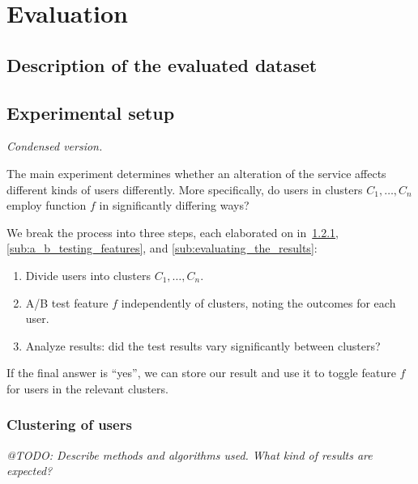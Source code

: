 \chapter{Evaluation}

\label{Chapter4}


\section{Description of the evaluated dataset} %
\label{sec:description_of_the_evaluated_dataset}


\section{Experimental setup} %
\label{sec:experimental_setup}

\emph{Condensed version.}

The main experiment determines whether an alteration of the service affects different kinds of users differently.
More specifically, do users in clusters $C_1, \ldots, C_n$ employ function $f$ in significantly differing ways?

We break the process into three steps, each elaborated on in~\ref{sub:clustering_of_users}, \ref{sub:a_b_testing_features}, and \ref{sub:evaluating_the_results}:

\begin{enumerate}
  \item Divide users into clusters $C_1, \ldots, C_n$.
  \item A/B test feature $f$ independently of clusters, noting the outcomes for each user.
  \item Analyze results: did the test results vary significantly between clusters?
\end{enumerate}

If the final answer is ``yes'', we can store our result and use it to toggle feature $f$ for users in the relevant clusters.

\subsection{Clustering of users} %
\label{sub:clustering_of_users}

\emph{@TODO: Describe methods and algorithms used. What kind of results are expected?}

